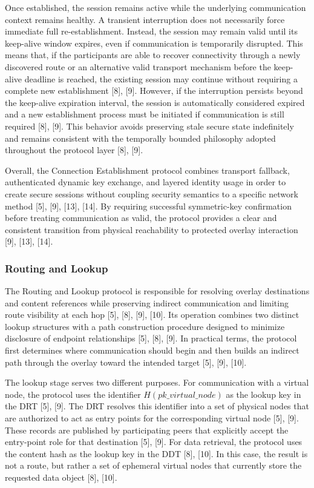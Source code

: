 \documentclass[12pt,a4paper]{article}
\begin{document}
Once established, the session remains active while the underlying communication
context remains healthy. A transient interruption does not necessarily force immediate
full re-establishment. Instead, the session may remain valid until its keep-alive window
expires, even if communication is temporarily disrupted. This means that, if the
participants are able to recover connectivity through a newly discovered route or an
alternative valid transport mechanism before the keep-alive deadline is reached, the
existing session may continue without requiring a complete new establishment [8], [9].
However, if the interruption persists beyond the keep-alive expiration interval, the
session is automatically considered expired and a new establishment process must be
initiated if communication is still required [8], [9]. This behavior avoids preserving stale
secure state indefinitely and remains consistent with the temporally bounded philosophy
adopted throughout the protocol layer [8], [9].

Overall, the Connection Establishment protocol combines transport fallback, authenticated dynamic key exchange, and layered identity usage in order to create secure sessions without coupling security semantics to a specific network method [5], [9], [13], [14]. By requiring successful symmetric-key confirmation before treating communication as valid, the protocol provides a clear and consistent transition from physical reachability to protected overlay interaction [9], [13], [14].

\subsubsection{Routing and Lookup}

The Routing and Lookup protocol is responsible for resolving overlay destinations and content references while preserving indirect communication and limiting route visibility at each hop [5], [8], [9], [10]. Its operation combines two distinct lookup structures with a path construction procedure designed to minimize disclosure of endpoint relationships [5], [8], [9]. In practical terms, the protocol first determines where communication should begin and then builds an indirect path through the overlay toward the intended target [5], [9], [10].

The lookup stage serves two different purposes. For communication with a virtual node, the protocol uses the identifier \(H(pk\_virtual\_node)\) as the lookup key in the DRT [5], [9]. The DRT resolves this identifier into a set of physical nodes that are authorized to act as entry points for the corresponding virtual node [5], [9]. These records are published by participating peers that explicitly accept the entry-point role for that destination [5], [9]. For data retrieval, the protocol uses the content hash as the lookup key in the DDT [8], [10]. In this case, the result is not a route, but rather a set of ephemeral virtual nodes that currently store the requested data object [8], [10].
\end{document}
